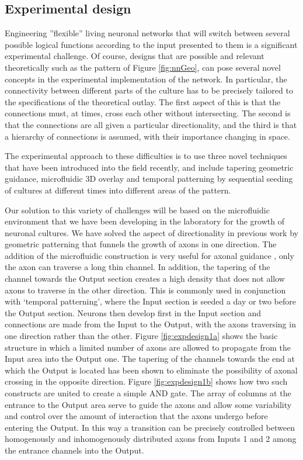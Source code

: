 \subsection{Experimental design}
Engineering ''flexible'' living neuronal networks that will switch between several possible logical functions according to the input presented to them is a significant experimental challenge. Of course, designs that are possible and relevant theoretically such as the pattern of Figure \ref{fig:nnGeo}, can pose several novel concepts in the experimental implementation of the network. In particular, the connectivity between different parts of the culture has to be precisely tailored to the specifications of the theoretical outlay. The first aspect of this is that the connections must, at times, cross each other without intersecting. The second is that the connections are all given a particular directionality, and the third is that a hierarchy of connections is assumed, with their importance changing in space.

The experimental approach to these difficulties is to use three novel techniques that have been introduced into the field recently, and include tapering geometric guidance, microfluidic 3D overlay and temporal patterning by sequential seeding of cultures at different times into different areas of the pattern.

Our solution to this variety of challenges will be based on the microfluidic environment that we have been developing in the laboratory for the growth of neuronal cultures. We have solved the aspect of directionality in previous work \cite{Feinerman2008} by geometric patterning that funnels the growth of axons in one direction. The addition of the microfluidic construction is very useful for axonal guidance \cite{Peyrin2011,Park2006,Taylor2005}, only the axon can traverse a long thin channel. In addition, the tapering of the channel towards the Output section creates a high density that does not allow axons to traverse in the other direction. This is commonly used in conjunction with ‘temporal patterning’, where the Input section is seeded a day or two before the Output section. Neurons then develop first in the Input section and connections are made from the Input to the Output, with the axons traversing in one direction rather than the other.
Figure \ref{fig:expdesign1a} shows the basic structure in which a limited number of axons are allowed to propagate from the Input area into the Output one. The tapering of the channels towards the end at which the Output is located has been shown \cite{Peyrin2011} to eliminate the possibility of axonal crossing in the opposite direction. Figure \ref{fig:expdesign1b} shows how two such constructs are united to create a simple AND gate. The array of columns at the entrance to the Output area serve to guide the axons and allow some variability and control over the amount of interaction that the axons undergo before entering the Output. In this way a transition can be precisely controlled between homogenously and inhomogenously distributed axons from Inputs 1 and 2 among the entrance channels into the Output.

